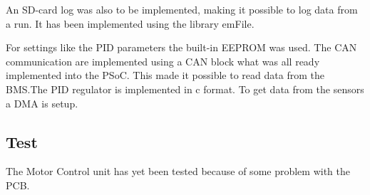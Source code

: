 An SD-card log was also to be implemented, making it possible to log data from a run. It has been implemented using the library emFile.

For settings like the PID parameters the built-in EEPROM was used.
The CAN communication are implemented using a CAN block what was all ready implemented into the PSoC. This made it possible to read data from the BMS.The PID regulator is implemented in c format. To get data from the sensors a DMA is setup.

\subsection{Test}

The Motor Control unit has yet been tested because of some problem with the PCB. 
